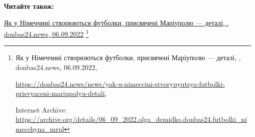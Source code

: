  
 
 
 
 

\def\pubIA{https://archive.org/details/06_09_2022.olga_demidko.donbas24.futbolki_nimecchyna_mrpl}
\def\pubTitle{Як у Німеччині створюються футболки, присвячені Маріуполю — деталі}
\def\pubDate{06.09.2022}
\def\pubOrigin{https://donbas24.news/news/yak-u-nimeccini-stvoryuyutsya-futbolki-prisvyaceni-mariupolyu-detali}
\def\pubAuthor{\pubAuthorDemidko}
\def\pubSite{donbas24.news}

\textbf{Читайте також:}\par\noindent \href{\pubIA}{%
\pubTitle, \pubAuthor, \pubSite, \pubDate}%
\footnote{\pubTitle, \pubAuthor, \pubSite, \pubDate, \par\url{\pubOrigin}, \par Internet Archive: \url{\pubIA}}
